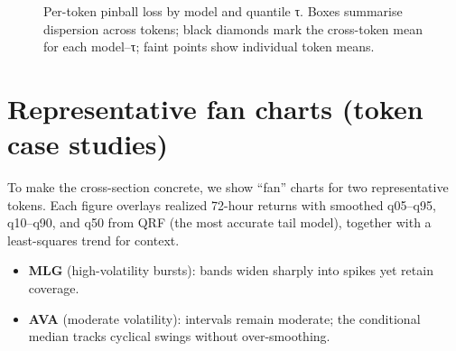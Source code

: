 \documentclass[
  a4paper,
  DIV=11,
  numbers=noendperiod]{scrreprt}
\providecommand{\tightlist}{%
  \setlength{\itemsep}{0pt}\setlength{\parskip}{0pt}}
\begin{document}
\begin{figure}


\caption{\label{fig-pinball-per-token}Per-token pinball loss by model
and quantile τ. Boxes summarise dispersion across tokens; black diamonds
mark the cross-token mean for each model--τ; faint points show
individual token means.}

\end{figure}%

\section{Representative fan charts (token case
studies)}\label{representative-fan-charts-token-case-studies}

To make the cross-section concrete, we show ``fan'' charts for two
representative tokens. Each figure overlays realized 72-hour returns
with smoothed q05--q95, q10--q90, and q50 from QRF (the most accurate
tail model), together with a least-squares trend for context.

\begin{itemize}
\tightlist
\item
  \textbf{MLG} (high-volatility bursts): bands widen sharply into spikes
  yet retain coverage.
\item
  \textbf{AVA} (moderate volatility): intervals remain moderate; the
  conditional median tracks cyclical swings without over-smoothing.
\end{itemize}
\end{document}
